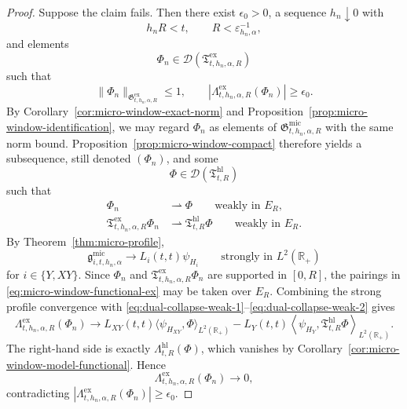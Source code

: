 \documentclass[11pt,a4paper]{amsart}
\theoremstyle{plain}
\theoremstyle{definition}
\theoremstyle{remark}
\newcommand{\R}{\mathbb{R}}
\begin{document}
\begin{proof}
Suppose the claim fails. Then there exist \(\epsilon_0>0\), a sequence \(h_n\downarrow0\) with
\[
h_nR<t,
\qquad
R<\varepsilon_{h_n,\alpha}^{-1},
\]
and elements
\[
\Phi_n\in\mathcal D(\mathfrak T_{t,h_n,\alpha,R}^{\mathrm{ex}})
\]
such that
\[
\|\Phi_n\|_{\mathfrak G_{t,h_n,\alpha,R}^{\mathrm{ex}}}\le1,
\qquad
\left|
\Lambda_{t,h_n,\alpha,R}^{\mathrm{ex}}(\Phi_n)
\right|
\ge
\epsilon_0.
\]
By Corollary~\ref{cor:micro-window-exact-norm} and Proposition~\ref{prop:micro-window-identification},
we may regard \(\Phi_n\) as elements of \(\mathfrak G_{t,h_n,\alpha,R}^{\mathrm{mic}}\) with the same
norm bound. Proposition~\ref{prop:micro-window-compact} therefore yields a subsequence, still
denoted \((\Phi_n)\), and some
\[
\Phi\in \mathcal D(\mathfrak T_{t,R}^{\mathrm{hl}})
\]
such that
\begin{align}
\Phi_n &\rightharpoonup \Phi
\qquad\text{weakly in }E_R,
\label{eq:dual-collapse-weak-1}\\
\mathfrak T_{t,h_n,\alpha,R}^{\mathrm{ex}}\Phi_n
&\rightharpoonup
\mathfrak T_{t,R}^{\mathrm{hl}}\Phi
\qquad\text{weakly in }E_R.
\label{eq:dual-collapse-weak-2}
\end{align}
By Theorem~\ref{thm:micro-profile},
\[
\mathfrak g_{i,t,h_n,\alpha}^{\mathrm{mic}}
\longrightarrow
L_i(t,t)\psi_{H_i}
\qquad\text{strongly in }L^2(\R_+)
\]
for \(i\in\{Y,XY\}\). Since \(\Phi_n\) and
\(\mathfrak T_{t,h_n,\alpha,R}^{\mathrm{ex}}\Phi_n\) are supported in \([0,R]\), the pairings in
\eqref{eq:micro-window-functional-ex} may be taken over \(E_R\). Combining the strong profile
convergence with \eqref{eq:dual-collapse-weak-1}--\eqref{eq:dual-collapse-weak-2} gives
\[
\Lambda_{t,h_n,\alpha,R}^{\mathrm{ex}}(\Phi_n)
\longrightarrow
L_{XY}(t,t)\langle \psi_{H_{XY}},\Phi\rangle_{L^2(\R_+)}
-
L_Y(t,t)
\left\langle
\psi_{H_Y},
\mathfrak T_{t,R}^{\mathrm{hl}}\Phi
\right\rangle_{L^2(\R_+)}.
\]
The right-hand side is exactly \(\Lambda_{t,R}^{\mathrm{hl}}(\Phi)\), which vanishes by
Corollary~\ref{cor:micro-window-model-functional}. Hence
\[
\Lambda_{t,h_n,\alpha,R}^{\mathrm{ex}}(\Phi_n)\to0,
\]
contradicting \(|\Lambda_{t,h_n,\alpha,R}^{\mathrm{ex}}(\Phi_n)|\ge\epsilon_0\).
\end{proof}
\end{document}
